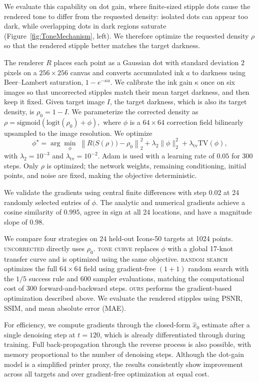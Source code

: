 \documentclass{egpubl}
\begin{document}
We evaluate this capability on dot gain, where finite-sized stipple dots cause the rendered tone to differ from the requested density: isolated dots can appear too dark, while overlapping dots in dark regions saturate (Figure~\ref{fig:ToneMechanism}, left). We therefore optimize the requested density $\rho$ so that the rendered stipple better matches the target darkness.

The renderer $R$ places each point as a Gaussian dot with standard deviation $2$ pixels on a $256\times256$ canvas and converts accumulated ink $a$ to darkness using Beer--Lambert saturation, $1-e^{-\kappa a}$. We calibrate the ink gain $\kappa$ once on six images so that uncorrected stipples match their mean target darkness, and then keep it fixed. Given target image $I$, the target darkness, which is also its target density, is $\rho_0=1-I$. We parameterize the corrected density as
$
\rho=\mathrm{sigmoid}\!\left(\mathrm{logit}(\rho_0)+\phi\right),
$
where $\phi$ is a $64\times64$ correction field bilinearly upsampled to the image resolution. We optimize
$$
\phi^\star=\arg\min_{\phi}\;
\left\lVert R\bigl(S(\rho)\bigr)-\rho_0\right\rVert_2^2
+\lambda_2\lVert\phi\rVert_2^2
+\lambda_{\mathrm{tv}}\mathrm{TV}(\phi),
$$
with $\lambda_2=10^{-3}$ and $\lambda_{\mathrm{tv}}=10^{-2}$. Adam is used with a learning rate of $0.05$ for 300 steps. Only $\rho$ is optimized; the network weights, remaining conditioning, initial points, and noise are fixed, making the objective deterministic.

We validate the gradients using central finite differences with step $0.02$ at 24 randomly selected entries of $\phi$. The analytic and numerical gradients achieve a cosine similarity of $0.995$, agree in sign at all 24 locations, and have a magnitude slope of $0.98$.

We compare four strategies on 24 held-out Icons-50 targets at 1024 points. \textsc{uncorrected} directly uses $\rho_0$. \textsc{tone curve} replaces $\phi$ with a global 17-knot transfer curve and is optimized using the same objective. \textsc{random search} optimizes the full $64\times64$ field using gradient-free $(1{+}1)$ random search with the $1/5$ success rule and 600 sampler evaluations, matching the computational cost of 300 forward-and-backward steps. \textsc{ours} performs the gradient-based optimization described above. We evaluate the rendered stipples using PSNR, SSIM, and mean absolute error (MAE).

For efficiency, we compute gradients through the closed-form $\hat{x}_0$ estimate after a single denoising step at $t=120$, which is already differentiated through during training. Full back-propagation through the reverse process is also possible, with memory proportional to the number of denoising steps. Although the dot-gain model is a simplified printer proxy, the results consistently show improvement across all targets and over gradient-free optimization at equal cost.
\end{document}
